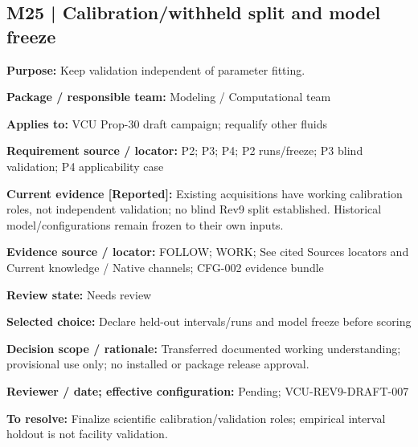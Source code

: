 \documentclass[11pt]{article}
\begin{document}
\par\noindent\begin{minipage}{\textwidth}\small\setlength{\parskip}{2pt}
\subsection*{M25 | Calibration/withheld split and model freeze}
\textbf{Purpose:} Keep validation independent of parameter fitting.\par
\textbf{Package / responsible team:} Modeling / Computational team\par
\textbf{Applies to:} VCU Prop-30 draft campaign; requalify other fluids\par
\textbf{Requirement source / locator:} P2; P3; P4; P2 runs/freeze; P3 blind validation; P4 applicability case\par
\textbf{Current evidence [Reported]:} Existing acquisitions have working calibration roles, not independent validation; no blind Rev9 split established. Historical model/configurations remain frozen to their own inputs.\par
\textbf{Evidence source / locator:} FOLLOW; WORK; See cited Sources locators and Current knowledge / Native channels; CFG-002 evidence bundle\par
\textbf{Review state:} Needs review\par
\textbf{Selected choice:} Declare held-out intervals/runs and model freeze before scoring\par
\textbf{Decision scope / rationale:} Transferred documented working understanding; provisional use only; no installed or package release approval.\par
\textbf{Reviewer / date; effective configuration:} Pending; VCU-REV9-DRAFT-007\par
\textbf{To resolve:} Finalize scientific calibration/validation roles; empirical interval holdout is not facility validation.\par
\end{minipage}\par\vspace{5pt}
\end{document}
